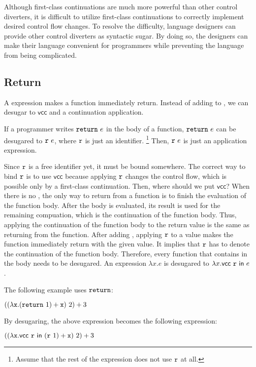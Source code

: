 Although first-class continuations are much more powerful than other control
diverters, it is difficult to utilize first-class continuations to correctly
implement desired control flow changes. To resolve the difficulty, language
designers can provide other control diverters as syntactic sugar. By doing so,
the designers can make their language convenient for programmers while
preventing the language from being complicated.

\subsection{Return}

A  expression makes a function immediately return.
Instead of adding  to \Lang, we can desugar  to
$\textsf{vcc}$ and a continuation application.

If a programmer writes
$\code{return}\ e$ in the body of a function, $\code{return}\ e$
can be desugared to $\texttt{r}\ e$, where $\texttt{r}$ is just an identifier.
\footnote{Assume that the rest of the expression does not use $\texttt{r}$ at all.}
Then, $\texttt{r}\ e$ is just an application expression.

Since $\texttt{r}$ is a free
identifier yet, it must be bound somewhere. The correct way to bind $\texttt{r}$
is to use $\textsf{vcc}$ because applying $\texttt{r}$ changes the control flow,
which is possible only by a first-class continuation. Then, where should we put
$\textsf{vcc}$? When there is no
, the only way to return from a function is to finish the
evaluation of the function body. After the body is evaluated, its result is used
for the remaining compuation, which is the continuation of the function body.
Thus, applying the continuation of the function body to the return value is the same as
returning from the function. After adding , applying $\texttt{r}$
to a value makes the function immediately return with the given value.
It implies that $\texttt{r}$ has to denote the continuation of the function body.
Therefore, every function that contains  in the body needs to be
desugared. An expression $\lambda x.e$ is desugared to
$\lambda x.\textsf{vcc}\ \texttt{r}\ \textsf{in}\ e$.

The following example uses $\texttt{return}$:

$((\lambda \cx.(\code{return}\ 1)+\cx)\ 2)+3$

By desugaring, the above expression becomes the following expression:

$((\lambda \cx.\evcc{\code{r}}{(\code{r}\ 1)+\cx})\ 2)+3$

